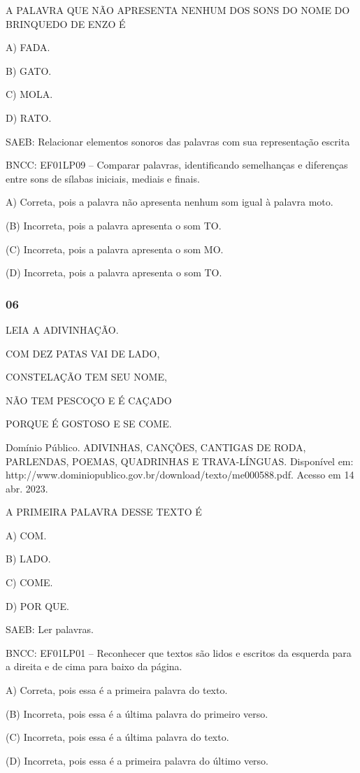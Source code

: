 A PALAVRA QUE NÃO APRESENTA NENHUM DOS SONS DO NOME DO BRINQUEDO DE ENZO É

A) FADA.

B) GATO.

C) MOLA.

D) RATO.

SAEB: Relacionar elementos sonoros das palavras com sua representação escrita

BNCC: EF01LP09 -- Comparar palavras, identificando semelhanças e diferenças entre sons de sílabas iniciais, mediais e finais.

A) Correta, pois a palavra não apresenta nenhum som igual à palavra
moto.

(B) Incorreta, pois a palavra apresenta o som TO.

(C) Incorreta, pois a palavra apresenta o som MO.

(D) Incorreta, pois a palavra apresenta o som TO.

\subsubsection{06}\label{section-78}

LEIA A ADIVINHAÇÃO.

COM DEZ PATAS VAI DE LADO,

CONSTELAÇÃO TEM SEU NOME,

NÃO TEM PESCOÇO E É CAÇADO

PORQUE É GOSTOSO E SE COME.

Domínio Público. ADIVINHAS, CANÇÕES, CANTIGAS DE RODA, PARLENDAS, POEMAS, QUADRINHAS E TRAVA-LÍNGUAS. Disponível em: http://www.dominiopublico.gov.br/download/texto/me000588.pdf. Acesso em 14 abr. 2023.

A PRIMEIRA PALAVRA DESSE TEXTO É

A) COM.

B) LADO.

C) COME.

D) POR QUE.

SAEB: Ler palavras.

BNCC: EF01LP01 -- Reconhecer que textos são lidos e escritos da esquerda para a
direita e de cima para baixo da página.

A) Correta, pois essa é a primeira palavra do texto.

(B) Incorreta, pois essa é a última palavra do primeiro verso.

(C) Incorreta, pois essa é a última palavra do texto.

(D) Incorreta, pois essa é a primeira palavra do último
verso.\protect\hypertarget{_heading=h.bww9mmn8u5sl}{}{}

